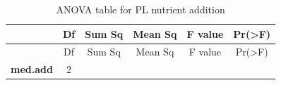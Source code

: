 \documentclass[]{article}
\begin{document}
\begin{longtable}[]{@{}cccccc@{}}
\caption{ANOVA table for PL nutrient addition}\tabularnewline
\toprule
\begin{minipage}[b]{0.19\columnwidth}\centering\strut
~
\strut\end{minipage} &
\begin{minipage}[b]{0.06\columnwidth}\centering\strut
Df
\strut\end{minipage} &
\begin{minipage}[b]{0.10\columnwidth}\centering\strut
Sum Sq
\strut\end{minipage} &
\begin{minipage}[b]{0.12\columnwidth}\centering\strut
Mean Sq
\strut\end{minipage} &
\begin{minipage}[b]{0.12\columnwidth}\centering\strut
F value
\strut\end{minipage} &
\begin{minipage}[b]{0.12\columnwidth}\centering\strut
Pr(\textgreater{}F)
\strut\end{minipage}\tabularnewline
\midrule
\endfirsthead
\toprule
\begin{minipage}[b]{0.19\columnwidth}\centering\strut
~
\strut\end{minipage} &
\begin{minipage}[b]{0.06\columnwidth}\centering\strut
Df
\strut\end{minipage} &
\begin{minipage}[b]{0.10\columnwidth}\centering\strut
Sum Sq
\strut\end{minipage} &
\begin{minipage}[b]{0.12\columnwidth}\centering\strut
Mean Sq
\strut\end{minipage} &
\begin{minipage}[b]{0.12\columnwidth}\centering\strut
F value
\strut\end{minipage} &
\begin{minipage}[b]{0.12\columnwidth}\centering\strut
Pr(\textgreater{}F)
\strut\end{minipage}\tabularnewline
\midrule
\endhead
\begin{minipage}[t]{0.19\columnwidth}\centering\strut
\textbf{med.add}
\strut\end{minipage} &
\begin{minipage}[t]{0.06\columnwidth}\centering\strut
2
\strut\end{minipage} &
\begin{minipage}[t]{0.10\columnwidth}\centering\strut

\end{minipage}
\end{longtable}
\end{document}

